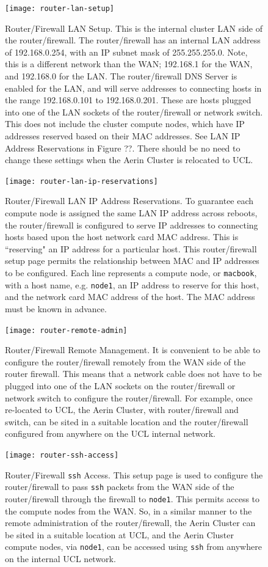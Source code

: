 \documentclass{report}
\begin{document}
\begin{figure}[H]
	\centering	
	\texttt{[image: router-lan-setup]}
	\caption{Router/Firewall LAN Setup. This is the internal cluster LAN side of the router/firewall. The router/firewall has an internal LAN address of 192.168.0.254, with an IP subnet mask of 255.255.255.0. Note, this is a different network than the WAN; 192.168.1 for the WAN, and 192.168.0 for the LAN. The router/firewall DNS Server is enabled for the LAN, and will serve addresses to connecting hosts in the range 192.168.0.101 to 192.168.0.201. These are hosts plugged into one of the LAN sockets of the router/firewall or network switch. This does not include the cluster compute nodes, which have IP addresses reserved based on their MAC addresses. See LAN IP Address Reservations in Figure ??. There should be no need to change these settings when the Aerin Cluster is relocated to UCL.}
\end{figure}

\begin{figure}[H]
	\centering	
	\texttt{[image: router-lan-ip-reservations]}
	\caption{Router/Firewall LAN IP Address Reservations. To guarantee each compute node is assigned the same LAN IP address across reboots, the router/firewall is configured to serve IP addresses to connecting hosts based upon the host network card MAC address. This is ``reserving" an IP address for a particular host. This router/firewall setup page permits the relationship between MAC and IP addresses to be configured. Each line represents a compute node, or \texttt{macbook}, with a host name, e.g. \texttt{node1}, an IP address to reserve for this host, and the network card MAC address of the host. The MAC address must be known in advance.}
\end{figure}

\begin{figure}[H]
	\centering	
	\texttt{[image: router-remote-admin]}
	\caption{Router/Firewall Remote Management. It is convenient to be able to configure the router/firewall remotely from the WAN side of the router firewall. This means that a network cable does not have to be plugged into one of the LAN sockets on the router/firewall or network switch to configure the router/firewall. For example, once re-located to UCL, the Aerin Cluster, with router/firewall and switch, can be sited in a suitable location and the router/firewall configured from anywhere on the UCL internal network.}
\end{figure}

\begin{figure}[H]
	\centering	
	\texttt{[image: router-ssh-access]}
	\caption{Router/Firewall \texttt{ssh} Access. This setup page is used to configure the router/firewall to pass \texttt{ssh} packets from the WAN side of the router/firewall through the firewall to \texttt{node1}. This permits access to the compute nodes from the WAN. So, in a similar manner to the remote administration of the router/firewall, the Aerin Cluster can be sited in a suitable location at UCL, and the Aerin Cluster compute nodes, via \texttt{node1}, can be accessed using \texttt{ssh} from anywhere on the internal UCL network.}
\end{figure}
\end{document}
